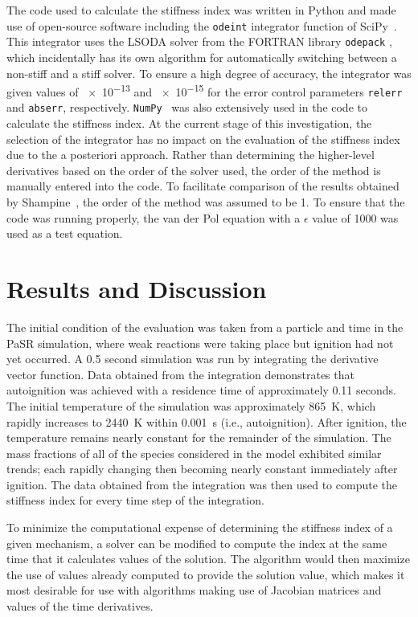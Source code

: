 \documentclass[12pt]{ussci}
\begin{document}
The code used to calculate the stiffness index was written in Python and made use of open-source software including the \texttt{odeint} integrator function of SciPy~\cite{SciPy}. This integrator uses the LSODA solver from the FORTRAN library \texttt{odepack} \cite{A.C.Hindmarsh1983}, which incidentally has its own algorithm for automatically switching between a non-stiff and a stiff solver. To ensure a high degree of accuracy, the integrator was given values of \num{e-13} and \num{e-15} for the error control parameters \texttt{relerr} and \texttt{abserr}, respectively. \texttt{NumPy}~\cite{VanDerWalt2011} was also extensively used in the code to calculate the stiffness index.  At the current stage of this investigation, the selection of the integrator has no impact on the evaluation of the stiffness index due to the a posteriori approach. Rather than determining the higher-level derivatives based on the order of the solver used, the order of the method is manually entered into the code. To facilitate comparison of the results obtained by Shampine~\cite{Shampine1985}, the order of the method was assumed to be 1. To ensure that the code was running properly, the van der Pol equation with a \(\epsilon\) value of 1000 was used as a test equation.

\section{Results and Discussion}
%
The initial condition of the evaluation was taken from a particle and time in the PaSR simulation, where weak reactions were taking place but ignition had not yet occurred. A 0.5 second simulation was run by integrating the derivative vector function.
Data obtained from the integration demonstrates that autoignition was achieved with a residence time of approximately 0.11 seconds.
The initial temperature of the simulation was approximately \SI{865}{\kelvin}, which rapidly increases to \SI{2440}{\kelvin} within \SI{0.001}{\second} (i.e., autoignition). 
After ignition, the temperature remains nearly constant for the remainder of the simulation. The mass fractions of all of the species considered in the model exhibited similar trends; each rapidly changing then becoming nearly constant immediately after ignition.
The data obtained from the integration was then used to compute the stiffness index for every time step of the integration.

To minimize the computational expense of determining the stiffness index of a given mechanism, a solver can be modified to compute the index at the same time that it calculates values of the solution. The algorithm would then maximize the use of values already computed to provide the solution value, which makes it most desirable for use with algorithms making use of Jacobian matrices and values of the time derivatives.
\end{document}
